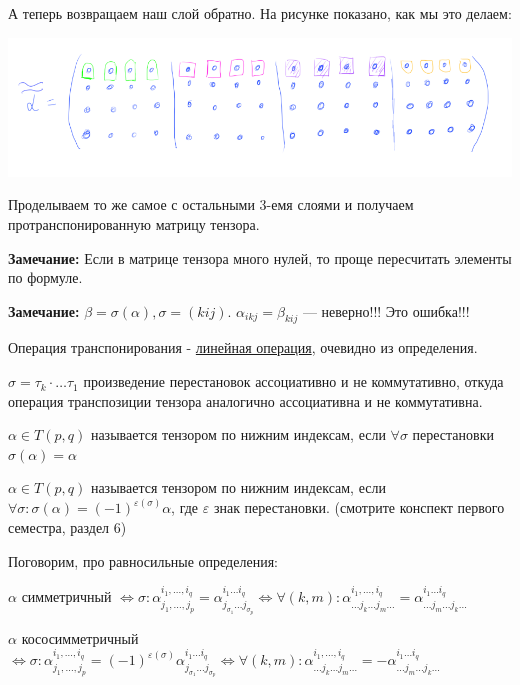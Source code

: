 А теперь возвращаем наш слой обратно. На рисунке показано, как мы это делаем:
 \begin{center}
         \includegraphics[width = 18cm]{assets/8_4-sample-4.png}
 \end{center}
Проделываем то же самое с остальными 3-емя слоями и получаем протранспонированную матрицу тензора.

\textbf{Замечание:} Если в матрице тензора много нулей, то проще пересчитать элементы по формуле.

\textbf{Замечание:} $\beta =\sigma(\alpha), \sigma = (kij)$. $\alpha_{ikj} = \beta_{kij}$ --- неверно!!! Это ошибка!!!

Операция транспонирования - \uline{линейная операция}, очевидно из определения.

$\sigma = \tau_k \cdot \ldots \tau_1$ произведение перестановок ассоциативно и не коммутативно, откуда операция транспозиции тензора аналогично ассоциативна и не коммутативна.

 $\alpha \in T(p,q)$ называется  тензором по нижним индексам, если $\forall \sigma$ перестановки $\sigma(\alpha) = \alpha$

 $\alpha \in T(p,q)$ называется  тензором по нижним индексам, если $\forall \sigma: \sigma(\alpha) = (-1)^{\varepsilon(\sigma)
}\alpha$, где $\varepsilon$ знак перестановки. (смотрите конспект первого семестра, раздел 6)

Поговорим, про равносильные определения:

$\alpha$ симметричный $\Leftrightarrow \sigma: \alpha_{j_1,\ldots, j_p}^{i_1,\ldots, i_q} = \alpha_{j_{\sigma_1}\ldots j_{\sigma_p}}^{i_1 \ldots i_q} \Leftrightarrow \forall (k,m): \alpha_{\ldots j_k \ldots j_m \ldots}^{i_1,\ldots, i_q} = \alpha_{\ldots j_m \ldots j_k \ldots}^{i_1 \ldots i_q}$

$\alpha$ кососимметричный $\Leftrightarrow \sigma: \alpha_{j_1,\ldots, j_p}^{i_1,\ldots, i_q} = (-1)^{\varepsilon(\sigma)}\alpha_{j_{\sigma_1}\ldots j_{\sigma_p}}^{i_1 \ldots i_q} \Leftrightarrow \forall (k,m): \alpha_{\ldots j_k \ldots j_m \ldots}^{i_1,\ldots, i_q} = -\alpha_{\ldots j_m \ldots j_k \ldots}^{i_1 \ldots i_q}$

